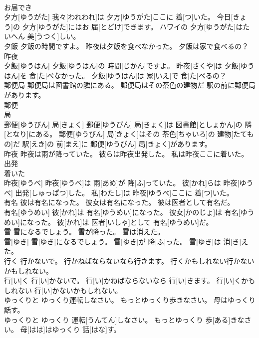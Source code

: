 \documentclass[8pt]{extreport}
\begin{document}
\begin{CJK}{UTF8}{min}
\\	お届でき 
\\	夕方[ゆうがた] 我々[われわれ]は 夕方[ゆうがた]ここに 着[つ]いた。 今日[きょう]の 夕方[ゆうがた]にはお 届[とどけ]できます。 ハワイの 夕方[ゆうがた]はたいへん 美[うつく]しい。
\\	夕飯 夕飯の時間ですよ。 昨夜は夕飯を食べなかった。 夕飯は家で食べるの？	
\\	昨夜 
\\	夕飯[ゆうはん] 夕飯[ゆうはん]の 時間[じかん]ですよ。 昨夜[さくや]は 夕飯[ゆうはん]を 食[た]べなかった。 夕飯[ゆうはん]は 家[いえ]で 食[た]べるの？
\\	郵便局 郵便局は図書館の隣にある。 郵便局はその茶色の建物だ 駅の前に郵便局があります。	
\\	郵便 
\\	局 
\\	郵便[ゆうびん] 局[きょく] 郵便[ゆうびん] 局[きょく]は 図書館[としょかん]の 隣[となり]にある。 郵便[ゆうびん] 局[きょく]はその 茶色[ちゃいろ]の 建物[たてもの]だ 駅[えき]の 前[まえ]に 郵便[ゆうびん] 局[きょく]があります。
\\	昨夜 昨夜は雨が降っていた。 彼らは昨夜出発した。 私は昨夜ここに着いた。	
\\	出発
\\	着いた 
\\	昨夜[ゆうべ] 昨夜[ゆうべ]は 雨[あめ]が 降[ふ]っていた。 彼[かれ]らは 昨夜[ゆうべ] 出発[しゅっぱつ]した。 私[わたし]は 昨夜[ゆうべ]ここに 着[つ]いた。
\\	有名 彼は有名になった。 彼女は有名になった。 彼は医者として有名だ。	
\\	有名[ゆうめい] 彼[かれ]は 有名[ゆうめい]になった。 彼女[かのじょ]は 有名[ゆうめい]になった。 彼[かれ]は 医者[いしゃ]として 有名[ゆうめい]だ。
\\	雪 雪になるでしょう。 雪が降った。 雪は消えた。	
\\	雪[ゆき] 雪[ゆき]になるでしょう。 雪[ゆき]が 降[ふ]った。 雪[ゆき]は 消[き]えた。
\\	行く 行かないで。 行かねばならないなら行きます。 行くかもしれない行かないかもしれない。	
\\	行[い]く 行[い]かないで。 行[い]かねばならないなら 行[い]きます。 行[い]くかもしれない 行[い]かないかもしれない。
\\	ゆっくりと ゆっくり運転しなさい。 もっとゆっくり歩きなさい。 母はゆっくり話す。	
\\	ゆっくりと ゆっくり 運転[うんてん]しなさい。 もっとゆっくり 歩[ある]きなさい。 母[はは]はゆっくり 話[はな]す。

\end{CJK}
\end{document}
